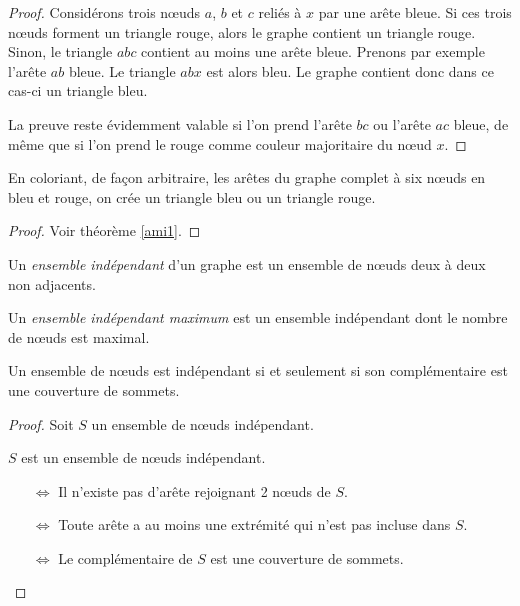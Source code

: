 \begin{mytheo} 
\begin{proof}
     Considérons trois nœuds $a$, $b$ et $c$ reliés à $x$ par une arête bleue.
     Si ces trois nœuds forment un triangle rouge, alors le graphe contient un triangle rouge.
     Sinon, le triangle $abc$ contient au moins une arête bleue.
     Prenons par exemple l'arête $ab$ bleue. Le triangle $abx$ est alors bleu.
     Le graphe contient donc dans ce cas-ci un triangle bleu.

     La preuve reste évidemment valable si l'on prend l'arête $bc$ ou l'arête $ac$ bleue,
     de même que si l'on prend le rouge comme couleur majoritaire du nœud $x$.
  \end{proof}
\end{mytheo}

\begin{mytheo}  \label{ami2}
  En coloriant, de façon arbitraire, les arêtes du graphe complet à six nœuds en bleu et rouge, on crée un triangle bleu ou un triangle rouge.
  \begin{proof}
  	Voir théorème \ref{ami1}.
  \end{proof}
\end{mytheo}

\begin{mydef}
  Un \emph{ensemble indépendant} d'un graphe est un ensemble de nœuds deux à deux non adjacents.
\end{mydef}

\begin{mydef}
  Un \emph{ensemble indépendant maximum} est un ensemble indépendant dont le nombre de nœuds est maximal.
\end{mydef}

\begin{mytheo}
Un ensemble de nœuds est indépendant si et seulement si son complémentaire est une couverture de sommets.
\begin{proof}
Soit $S$ un ensemble de nœuds indépendant.

$S$ est un ensemble de nœuds indépendant.
\begin{itemize}
  \item[$\Leftrightarrow$] Il n'existe pas d'arête rejoignant 2 nœuds de $S$.
  \item[$\Leftrightarrow$] Toute arête a au moins une extrémité qui n'est pas incluse dans $S$.
  \item[$\Leftrightarrow$] Le complémentaire de $S$ est une couverture de sommets.
\end{itemize}
\end{proof}
\end{mytheo}

